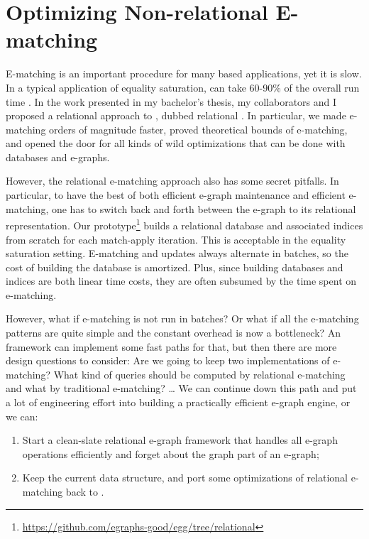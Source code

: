 \chapter{Optimizing Non-relational E-matching}\label{chapter/nonrel-em}

E-matching is an important procedure for many \egraph based applications,
 yet it is slow.
In a typical application of equality saturation,
 \ematching can take 60-90\% of the overall run time \citep{egg}.
In the work presented in my bachelor's thesis, 
 my collaborators and I proposed a relational approach to \ematching, 
 dubbed relational \ematching \citep{relational-ematching, relational-ematching-thesis}.
In particular,
 we made e-matching orders of magnitude faster, 
 proved theoretical bounds of e-matching, 
 and opened the door for all kinds of
 wild optimizations that can be done with databases and e-graphs.


However, 
 the relational e-matching approach also has some secret pitfalls.
In particular, 
 to have the best of both efficient e-graph maintenance and efficient e-matching, 
 one has to switch back and forth 
 between the e-graph to its relational representation.
Our prototype\footnote{\url{https://github.com/egraphs-good/egg/tree/relational}}
 builds a relational database and associated indices from
 scratch for each match-apply iteration.
This is acceptable in the equality saturation setting.
E-matching and updates always alternate in batches, 
 so the cost of building the database is amortized.
Plus, 
 since building databases and indices are both linear time costs, 
 they are often subsumed by the time spent on e-matching.

However, 
 what if e-matching is not run in batches? 
Or what if all the e-matching patterns are quite simple 
 and the constant overhead is now a bottleneck? 
An \egraph framework can implement some fast paths for that, 
 but then there are more design questions to consider: 
Are we going to keep two implementations of e-matching? 
What kind of queries should be computed by relational
 e-matching and what by traditional e-matching? \ldots{} 
We can continue down this path and put a lot of engineering effort into
 building a practically efficient e-graph engine, or we can:

\begin{enumerate}
\item
  Start a clean-slate relational e-graph framework that handles all
  e-graph operations efficiently and forget about the graph part of an
  e-graph;
\item
  Keep the current \egraph data structure, and port some optimizations of
  relational e-matching back to \egraphs.
\end{enumerate}

